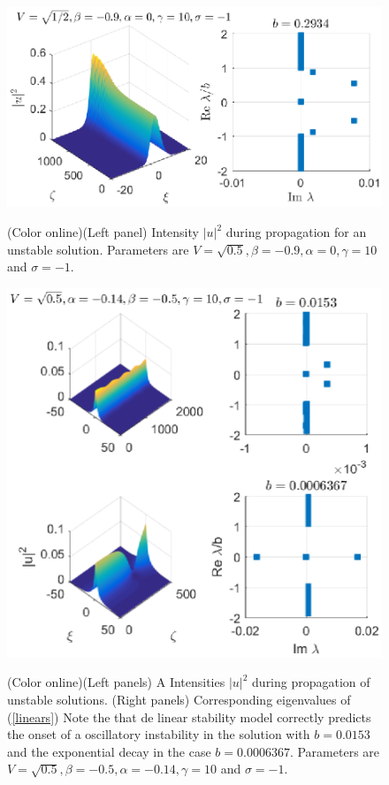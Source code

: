 \documentclass[aps,pre,showpacs,twocolumn]{revtex4}
\begin{document}
\begin{figure}[ht]
\begin{center}
\scalebox{.73} {\includegraphics{prop_V05_sat10_ds-09_c0_sigma-1.eps}}
\end{center}
\caption{(Color online)(Left panel) Intensity $|u|^2$ during propagation for an unstable solution. Parameters are $V=\sqrt{0.5},\beta=-0.9,\alpha=0,\gamma=10$ and $\sigma=-1$.}%
\label{fig:prop_V05_sat10_ds-09_c0_sigma-1}%
\end{figure}
\begin{figure}[ht]
\begin{center}
\scalebox{.75} {\includegraphics{prop_V05_sat10_ds-05_c-014_sigma-1.eps}}
\end{center}
\caption{(Color online)(Left panels) A Intensities $|u|^2$ during propagation of unstable solutions. (Right panels) Corresponding eigenvalues of (\ref{linears}) Note the that de linear stability model correctly predicts the onset of a oscillatory instability in the solution with $b=0.0153$ and the exponential decay in the case $b=0.0006367$. Parameters are $V=\sqrt{0.5},\beta=-0.5,\alpha=-0.14,\gamma=10$ and $\sigma=-1$.}%
\label{fig:prop_V05_sat10_ds-05_c-014_sigma-1}%
\end{figure}
\end{document}
